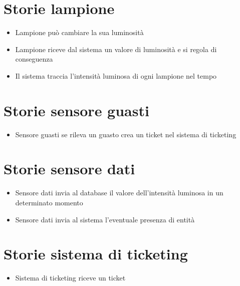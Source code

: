 \section{Storie lampione}
\begin{itemize}
\item Lampione può cambiare la sua luminosità
\item Lampione riceve dal sistema un valore di luminosità e si regola di conseguenza
\item Il sistema traccia l'intensità luminosa di ogni lampione nel tempo
\end{itemize}


\section{Storie sensore guasti}
\begin{itemize}
\item Sensore guasti se rileva un guasto crea un ticket nel sistema di ticketing
\end{itemize}


\section{Storie sensore dati}
\begin{itemize}
\item Sensore dati invia al database il valore dell'intensità luminosa in un determinato momento
\item Sensore dati invia al sistema l'eventuale presenza di entità
\end{itemize}

\section{Storie sistema di ticketing}
\begin{itemize}
\item Sistema di ticketing riceve un ticket
\end{itemize}
